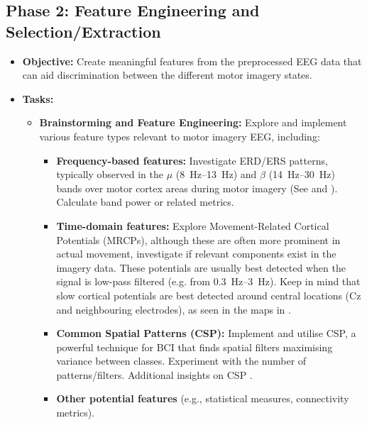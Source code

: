 \documentclass[11pt]{exam}
\begin{document}
    \subsection{Phase 2: Feature Engineering and Selection/Extraction} %
    \begin{itemize}
        \item \textbf{Objective:} Create meaningful features from the preprocessed EEG data that can aid discrimination between the different motor imagery states.
        \item \textbf{Tasks:}
        \begin{itemize}
            \item \textbf{Brainstorming and Feature Engineering:} Explore and implement various feature types relevant to motor imagery EEG, including:
            \begin{itemize}
                \item \textbf{Frequency-based features:} Investigate ERD/ERS patterns, typically observed in the \(\mu\) (\SIrange{8}{13}{\hertz}) and \(\beta\) (\SIrange{14}{30}{\hertz}) bands over motor cortex areas during motor imagery (See  and ). Calculate band power or related metrics.
                \item \textbf{Time-domain features:} Explore Movement-Related Cortical Potentials (MRCPs), although these are often more prominent in actual movement, investigate if relevant components exist in the imagery data. These potentials are usually best detected when the signal is low-pass filtered (e.g. from \SIrange{0.3}{3}{\hertz}). Keep in mind that slow cortical potentials are best detected around central locations (Cz and neighbouring electrodes), as seen in the maps in .
                \item \textbf{Common Spatial Patterns (CSP):} Implement and utilise CSP, a powerful technique for BCI that finds spatial filters maximising variance between classes. Experiment with the number of patterns/filters. Additional insights on CSP \href{https://doi.org/10.1109/MSP.2008.4408441}{}.
                \item \textbf{Other potential features} (e.g., statistical measures, connectivity metrics).
            \end{itemize}


\end{itemize}
\end{itemize}
\end{document}
